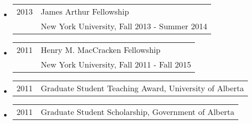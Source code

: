 \begin{itemize}
\item \begin{tabular}{ll}
2013 & James Arthur Fellowship \\
& New York University, Fall 2013 - Summer 2014 \\
\end{tabular}

\item \begin{tabular}{ll}
2011 & Henry M. MacCracken Fellowship \\
& New York University, Fall 2011 - Fall 2015 \\
\end{tabular}

\item \begin{tabular}{ll}
2011 & Graduate Student Teaching Award, University of Alberta \\
\end{tabular}

\item \begin{tabular}{ll}
2011 & Graduate Student Scholarship, Government of Alberta \\
\end{tabular}

%
%
%
%
%
%
%
%


\end{itemize}
